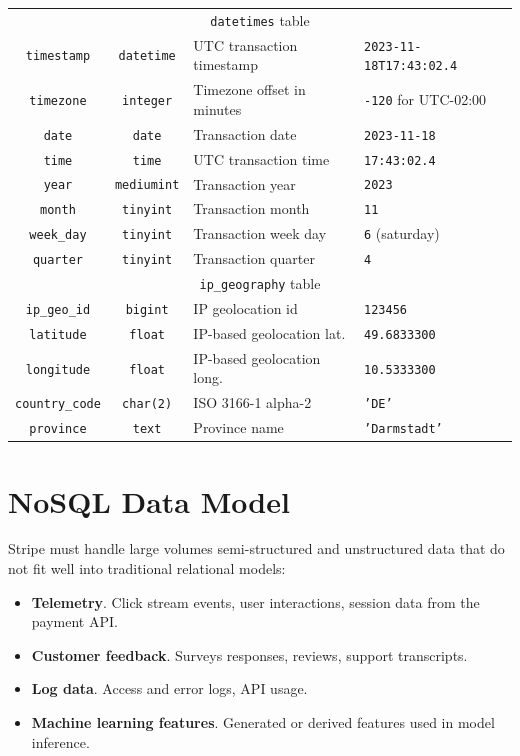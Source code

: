\documentclass[11pt,a4paper,computermodern]{article}
\newcommand{\code}{\texttt}
\begin{document}
\begin{table}[!htb]
\begin{threeparttable}
\begin{tabularx}{0.99\textwidth}{c c >{\centering\arraybackslash}X >{\centering\arraybackslash}X}
			\midrule
			\multicolumn{4}{c}{\code{datetimes} table}\\
			\code{timestamp} & \code{datetime} & UTC transaction timestamp & \code{2023-11-18T17:43:02.4} \\
			\code{timezone} & \code{integer} & Timezone offset in minutes & \code{-120} for UTC-02:00 \\
			\code{date} & \code{date} & Transaction date & \code{2023-11-18} \\
			\code{time} & \code{time} & UTC transaction time & \code{17:43:02.4} \\
			\code{year} & \code{mediumint} & Transaction year & \code{2023} \\
			\code{month} & \code{tinyint} & Transaction month & \code{11} \\
			\code{week\_day} & \code{tinyint} & Transaction week day & \code{6} (saturday) \\
			\code{quarter} & \code{tinyint} & Transaction quarter & \code{4} \\
			
			\midrule
			\multicolumn{4}{c}{\code{ip\_geography} table}\\
			\code{ip\_geo\_id} & \code{bigint} & IP geolocation id & \code{123456} \\
			\code{latitude} & \code{float} & IP-based geolocation lat. & \code{49.6833300} \\
			\code{longitude} & \code{float} & IP-based geolocation long. & \code{10.5333300} \\
			\code{country\_code} & \code{char(2)} & ISO 3166-1 alpha-2 & \code{'DE'} \\
			\code{province} & \code{text} & Province name & \code{'Darmstadt'} \\
			
			\bottomrule
		\end{tabularx}
	\end{threeparttable}
\end{table}


\clearpage
\section*{NoSQL Data Model}

Stripe must handle large volumes semi-structured and unstructured data that do not fit well into traditional relational models:
\begin{itemize}[itemsep=5pt, parsep=0pt]
	\item \textbf{Telemetry}. Click stream events, user interactions, session data from the payment API.
	\item \textbf{Customer feedback}. Surveys responses, reviews, support transcripts.
	\item \textbf{Log data}. Access and error logs, API usage.
	\item \textbf{Machine learning features}. Generated or derived features used in model inference.
\end{itemize}
\end{document}

